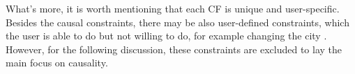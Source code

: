 What's more, it is worth mentioning that each CF is unique and user-specific. Besides the causal constraints, there may be also user-defined constraints, which the user is able to do but not willing to do, for example changing the city \cite{preservingCausal}. However, for the following discussion, these constraints are excluded to lay the main focus on causality.


